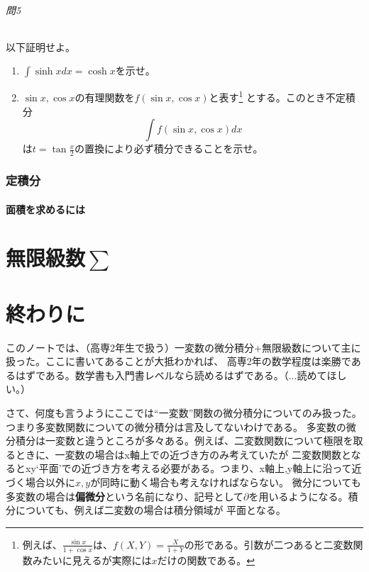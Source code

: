 \documentclass[a4j,dvipdfmx]{jsarticle}
\begin{document}
            \paragraph{問5}以下証明せよ。
                \begin{enumerate}\setcounter{enumi}{0}\renewcommand{\labelenumi}{(\arabic{enumi})}
                    \item $\displaystyle \int \sinh x dx = \cosh x$を示せ。
                    \item $\sin x,\cos x$の有理関数を$f(\sin x,\cos x)$と表す\footnote{例えば、$\frac{\sin x}{1+\cos x}$は、$f(X,Y)=\frac{X}{1+Y}$の形である。引数が二つあると二変数関数みたいに見えるが実際には$x$だけの関数である。}
                    とする。このとき不定積分
                        \begin{equation*}
                            \int f(\sin x,\cos x)dx
                        \end{equation*}
                        は$t=\tan\frac{x}{2}$の置換により必ず積分できることを示せ。
                \end{enumerate}
        \clearpage
        \section{定積分}
            \subsection{面積を求めるには}





    \clearpage
    \part{無限級数$\sum$}
    \clearpage
    \part{終わりに}
        このノートでは、（高専2年生で扱う）一変数の微分積分+無限級数について主に扱った。ここに書いてあることが大抵わかれば、
        高専2年の数学程度は楽勝であるはずである。数学書も入門書レベルなら読めるはずである。（...読めてほしい。）
        
        さて、何度も言うようにここでは``一変数''関数の微分積分についてのみ扱った。つまり多変数関数についての微分積分は言及してないわけである。
        多変数の微分積分は一変数と違うところが多々ある。例えば、二変数関数について極限を取るときに、一変数の場合はx軸上での近づき方のみ考えていたが
        二変数関数となるとxy`平面'での近づき方を考える必要がある。つまり、x軸上,y軸上に沿って近づく場合以外に$x,y$が同時に動く場合も考えなければならない。
        微分についても多変数の場合は\textbf{偏微分}という名前になり、記号として$\partial$を用いるようになる。積分についても、例えば二変数の場合は積分領域が
        平面となる。
\end{document}
